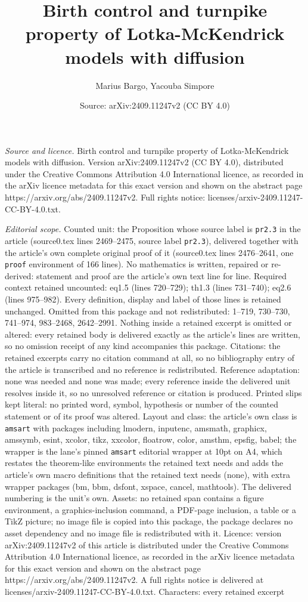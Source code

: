 \documentclass[10pt,a4paper]{amsart}
\title[Birth control and turnpike property of Lotka-McKendrick mode]{Birth control and turnpike property of Lotka-McKendrick models with diffusion}
\author{Marius Bargo, Yacouba Simpore}
\date{Source: arXiv:2409.11247v2 (CC BY 4.0)}
\begin{document}
\maketitle

\noindent\emph{Source and licence.} Birth control and turnpike property of Lotka-McKendrick models with diffusion. Version arXiv:2409.11247v2 (CC BY 4.0), distributed under the Creative Commons Attribution 4.0 International licence, as recorded in the arXiv licence metadata for this exact version and shown on the abstract page https://arxiv.org/abs/2409.11247v2. Full rights notice: licenses/arxiv-2409.11247-CC-BY-4.0.txt.\par\smallskip

\noindent\textit{Editorial scope.} Counted unit: the Proposition whose source label is \texttt{pr2.3} in the article (source0.tex lines 2469--2475, source label \texttt{pr2.3}), delivered together with the article's own complete original proof of it (source0.tex lines 2476--2641, one \texttt{proof} environment of 166 lines). No mathematics is written, repaired or re-derived: statement and proof are the article's own text line for line. Required context retained uncounted: eq1.5 (lines 720--729); th1.3 (lines 731--740); eq2.6 (lines 975--982). Every definition, display and label of those lines is retained unchanged. Omitted from this package and not redistributed: 1--719, 730--730, 741--974, 983--2468, 2642--2991. Nothing inside a retained excerpt is omitted or altered: every retained body is delivered exactly as the article's lines are written, so no omission receipt of any kind accompanies this package. Citations: the retained excerpts carry no citation command at all, so no bibliography entry of the article is transcribed and no reference is redistributed. Reference adaptation: none was needed and none was made; every reference inside the delivered unit resolves inside it, so no unresolved reference or citation is produced. Printed slips kept literal: no printed word, symbol, hypothesis or number of the counted statement or of its proof was altered. Layout and class: the article's own class is \texttt{amsart} with packages including lmodern, inputenc, amsmath, graphicx, amssymb, esint, xcolor, tikz, xxcolor, floatrow, color, amsthm, epsfig, babel; the wrapper is the lane's pinned \texttt{amsart} editorial wrapper at 10pt on A4, which restates the theorem-like environments the retained text needs and adds the article's own macro definitions that the retained text needs (none), with extra wrapper packages (bm, bbm, dsfont, xspace, cancel, mathtools). The delivered numbering is the unit's own. Assets: no retained span contains a figure environment, a graphics-inclusion command, a PDF-page inclusion, a table or a TikZ picture; no image file is copied into this package, the package declares no asset dependency and no image file is redistributed with it. Licence: version arXiv:2409.11247v2 of this article is distributed under the Creative Commons Attribution 4.0 International licence, as recorded in the arXiv licence metadata for this exact version and shown on the abstract page https://arxiv.org/abs/2409.11247v2. A full rights notice is delivered at licenses/arxiv-2409.11247-CC-BY-4.0.txt. Characters: every retained excerpt 
\end{document}

